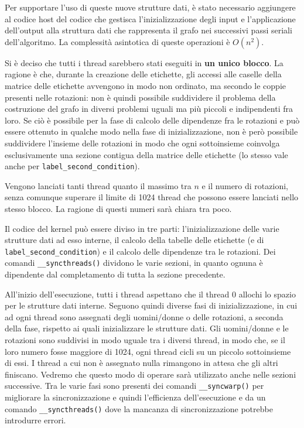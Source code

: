\documentclass[12pt]{article}
\begin{document}
    Per supportare l'uso di queste nuove strutture dati, è stato necessario aggiungere al codice host del codice che gestisca l'inizializzazione degli input e l'applicazione dell'output alla struttura dati che rappresenta il grafo nei successivi passi seriali dell'algoritmo. La complessità asintotica di queste operazioni è $O(n^2)$.

    Si è deciso che tutti i thread sarebbero stati eseguiti in \textbf{un unico blocco}. La ragione è che, durante la creazione delle etichette, gli accessi alle caselle della matrice delle etichette avvengono in modo non ordinato, ma secondo le coppie presenti nelle rotazioni: non è quindi possibile suddividere il problema della costruzione del grafo in diversi problemi uguali ma più piccoli e indipendenti fra loro. Se ciò è possibile per la fase di calcolo delle dipendenze fra le rotazioni e può essere ottenuto in qualche modo nella fase di inizializzazione, non è però possibile suddividere l'insieme delle rotazioni in modo che ogni sottoinsieme coinvolga esclusivamente una sezione contigua della matrice delle etichette (lo stesso vale anche per \texttt{label\_second\_condition}).

    Vengono lanciati tanti thread quanto il massimo tra $n$ e il numero di rotazioni, senza comunque superare il limite di 1024 thread che possono essere lanciati nello stesso blocco. La ragione di questi numeri sarà chiara tra poco.

    Il codice del kernel può essere diviso in tre parti: l'inizializzazione delle varie strutture dati ad esso interne, il calcolo della tabelle delle etichette (e di \texttt{label\_second\_condition}) e il calcolo delle dipendenze tra le rotazioni. Dei comandi \texttt{\_\_syncthreads()} dividono le varie sezioni, in quanto ognuna è dipendente dal completamento di tutta la sezione precedente.

    All'inizio dell'esecuzione, tutti i thread aspettano che il thread 0 allochi lo spazio per le strutture dati interne. Seguono quindi diverse fasi di inizializzazione, in cui ad ogni thread sono assegnati degli uomini/donne o delle rotazioni, a seconda della fase, rispetto ai quali inizializzare le strutture dati. Gli uomini/donne e le rotazioni sono suddivisi in modo uguale tra i diversi thread, in modo che, se il loro numero fosse maggiore di 1024, ogni thread cicli su un piccolo sottoinsieme di essi. I thread a cui non è assegnato nulla rimangono in attesa che gli altri finiscano. Vedremo che questo modo di operare sarà utilizzato anche nelle sezioni successive. Tra le varie fasi sono presenti dei comandi \texttt{\_\_syncwarp()} per migliorare la sincronizzazione e quindi l'efficienza dell'esecuzione e da un comando \texttt{\_\_syncthreads()} dove la mancanza di sincronizzazione potrebbe introdurre errori.
\end{document}

